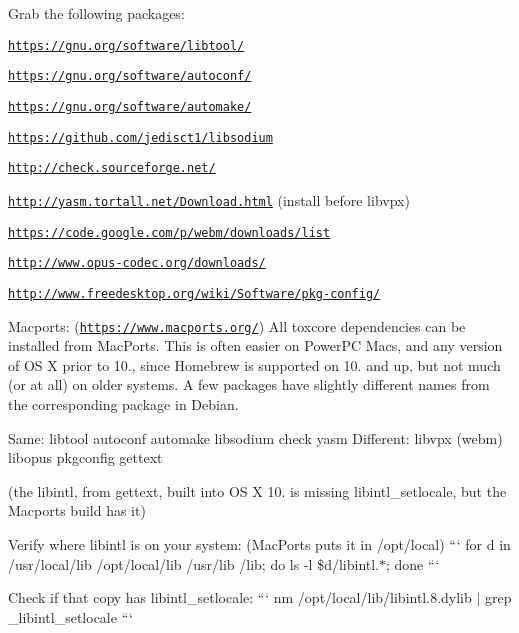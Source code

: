Grab the following packages\+:
\begin{DoxyItemize}
\item \href{https://gnu.org/software/libtool/}{\tt https\+://gnu.\+org/software/libtool/}
\item \href{https://gnu.org/software/autoconf/}{\tt https\+://gnu.\+org/software/autoconf/}
\item \href{https://gnu.org/software/automake/}{\tt https\+://gnu.\+org/software/automake/}
\item \href{https://github.com/jedisct1/libsodium}{\tt https\+://github.\+com/jedisct1/libsodium}
\item \href{http://check.sourceforge.net/}{\tt http\+://check.\+sourceforge.\+net/}
\item \href{http://yasm.tortall.net/Download.html}{\tt http\+://yasm.\+tortall.\+net/\+Download.\+html} (install before libvpx)
\item \href{https://code.google.com/p/webm/downloads/list}{\tt https\+://code.\+google.\+com/p/webm/downloads/list}
\item \href{http://www.opus-codec.org/downloads/}{\tt http\+://www.\+opus-\/codec.\+org/downloads/}
\item \href{http://www.freedesktop.org/wiki/Software/pkg-config/}{\tt http\+://www.\+freedesktop.\+org/wiki/\+Software/pkg-\/config/}
\end{DoxyItemize}

Macports\+: (\href{https://www.macports.org/}{\tt https\+://www.\+macports.\+org/}) All toxcore dependencies can be installed from Mac\+Ports. This is often easier on Power\+P\+C Macs, and any version of O\+S X prior to 10., since Homebrew is supported on 10. and up, but not much (or at all) on older systems. A few packages have slightly different names from the corresponding package in Debian.

Same\+: libtool autoconf automake libsodium check yasm Different\+: libvpx (webm) libopus pkgconfig gettext

(the libintl, from gettext, built into O\+S X 10. is missing libintl\+\_\+setlocale, but the Macports build has it)

Verify where libintl is on your system\+: (Mac\+Ports puts it in /opt/local) ``` for d in /usr/local/lib /opt/local/lib /usr/lib /lib; do ls -\/l \$d/libintl.$\ast$; done ```

Check if that copy has libintl\+\_\+setlocale\+: ``` nm /opt/local/lib/libintl.8.\+dylib $\vert$ grep \+\_\+libintl\+\_\+setlocale ```


